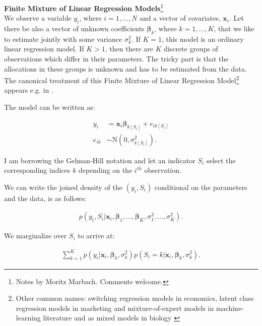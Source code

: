 \documentclass[11pt,a4paper]{article}
\begin{document}
\textbf{Finite Mixture of Linear Regression Models}\footnote{Notes by Moritz Marbach. Comments welcome.} \\

We observe a variable $y_i$, where $i = 1,...,N$ and a vector of covariates, $\mathbf{x}_i$. Let there be also a vector of unknown coefficients $\boldsymbol{\beta}_k$, where $k=1,...,K$, that we like to estimate jointly with some variance $\sigma^2_k$. If $K=1$, this model is an ordinary linear regression model. If $K > 1$, then there are $K$ discrete groups of observations which differ in their parameters. The tricky part is that the allocations in these groups is unknown and has to be estimated from the data. The canonical treatment of this Finite Mixture of Linear Regression Model\footnote{Other common names: switching regression models in economics, latent class regression models in marketing and mixture-of-expert models in machine-learning literature and as mixed models in biology \citet[p. 246]{FruehwirthSchnatter.2006}} appears e.g. in \citet{FruehwirthSchnatter.2006}.

The model can be written as: 

\begin{equation*}
\begin{split}
y_i &= \mathbf{x}_i \bm{\beta}_{k[S_i]} + e_{ik[S_i]} \\
e_{ik} &\sim \mathrm{N}(0,\sigma^2_{k[S_i]}). 
\end{split}
\end{equation*}

I am borrowing the Gelman-Hill notation \citep{Gelman.Hill.2006} and let an indicator $S_i$ select the corresponding indices $k$ depending on the  $i^{th}$ observation.

We can write the joined density of the $(y_i,S_i)$ conditional on the parameters and the data, is as follows: 

\begin{equation*}
\begin{split}
p(y_i, S_i | \mathbf{x}_i, \bm{\beta}_1,..., \bm{\beta}_K, \sigma^2_1,...,\sigma^2_K ). 
\end{split}
\end{equation*}

We marginalize over $S_i$ to arrive at: 

\begin{equation*}
\begin{split}
\sum_{k=1}^K p(y_i | \mathbf{x}_i, \bm{\beta}_k, \sigma^2_k) p(S_i=k | \mathbf{x}_i, \bm{\beta}_k, \sigma^2_k). 
\end{split}
\end{equation*}
\end{document}
